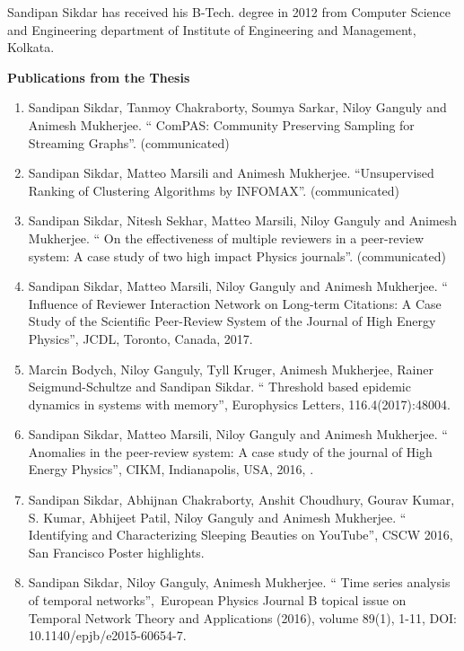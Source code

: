 
\noindent Sandipan Sikdar has received his B-Tech. degree in 2012 from Computer Science and Engineering department of Institute of Engineering and Management, Kolkata.  
  


\singlespace
\begin{center}
\vspace{0.3cm}
{\bfseries {\large Publications from the Thesis
}}
\vspace{0.3cm}
\end{center}

\begin{enumerate}
\item  Sandipan Sikdar, Tanmoy Chakraborty, Soumya Sarkar, Niloy Ganguly and Animesh Mukherjee. `` ComPAS: Community Preserving Sampling for Streaming Graphs''. (communicated)
\item  Sandipan Sikdar, Matteo Marsili and Animesh Mukherjee. ``Unsupervised Ranking of Clustering Algorithms by INFOMAX''. (communicated)
\item  Sandipan Sikdar, Nitesh Sekhar, Matteo Marsili, Niloy Ganguly and Animesh Mukherjee. `` On the effectiveness of multiple reviewers in a peer-review system: A case study of two high impact Physics journals''. (communicated)
 \item  Sandipan Sikdar, Matteo Marsili, Niloy Ganguly and Animesh Mukherjee. `` Influence of Reviewer Interaction Network on Long-term Citations: A Case Study of the Scientific Peer-Review System of the Journal of High Energy Physics'', JCDL, Toronto, Canada, 2017.
   \item  Marcin Bodych, Niloy Ganguly, Tyll Kruger, Animesh Mukherjee, Rainer Seigmund-Schultze and Sandipan Sikdar. `` Threshold based epidemic dynamics in systems with memory'', Europhysics Letters, 116.4(2017):48004.
   \item  Sandipan Sikdar, Matteo Marsili, Niloy Ganguly and Animesh Mukherjee. `` Anomalies in the peer-review system: A case study of the journal of High Energy Physics'', CIKM, Indianapolis, USA, 2016, .
   \item  Sandipan Sikdar, Abhijnan Chakraborty, Anshit Choudhury, Gourav Kumar, S. Kumar, Abhijeet Patil, Niloy Ganguly and Animesh Mukherjee. `` Identifying and Characterizing Sleeping Beauties on YouTube'', CSCW 2016, San Francisco Poster highlights.
   \item  Sandipan Sikdar, Niloy Ganguly, Animesh Mukherjee. `` Time series analysis of temporal networks'', European Physics Journal B topical issue on  Temporal Network Theory and Applications (2016), volume 89(1), 1-11, DOI: 10.1140/epjb/e2015-60654-7. 

\end{enumerate}
